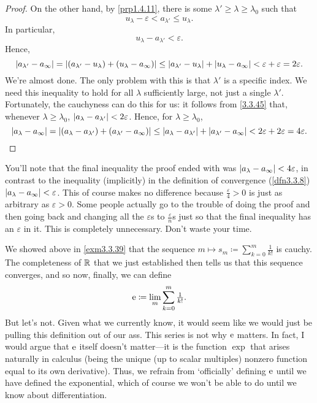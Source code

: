 \begin{thm}[Completeness of $\R$]
\begin{proof}
On the other hand, by \cref{prp1.4.11}, there is some $\lambda '\geq \lambda \geq \lambda _0$ such that
\begin{equation}
u_\lambda -\varepsilon <a_{\lambda '}\leq u_\lambda .
\end{equation}
In particular,
\begin{equation}
u_\lambda -a_{\lambda '}<\varepsilon .
\end{equation}
Hence,
\begin{equation}
\lvert a_{\lambda '}-a_\infty\rvert=\lvert(a_{\lambda '}-u_\lambda )+(u_\lambda -a_\infty )\rvert\leq \lvert a_{\lambda '}-u_\lambda\rvert+\lvert u_\lambda -a_\infty\rvert<\varepsilon +\varepsilon =2\varepsilon .
\end{equation}
We're almost done.  The only problem with this is that $\lambda '$ is a specific index.  We need this inequality to hold for all $\lambda$ sufficiently large, not just a single $\lambda '$.  Fortunately, the cauchyness can do this for us:  it follows from \eqref{3.3.45} that, whenever $\lambda \geq \lambda _0$, $\lvert a_\lambda -a_{\lambda '}\rvert<2\varepsilon$.  Hence, for $\lambda \geq \lambda _0$,
\begin{equation}
\lvert a_\lambda -a_\infty\rvert=\lvert(a_\lambda -a_{\lambda '})+(a_{\lambda '}-a_\infty)\rvert\leq \lvert a_\lambda -a_{\lambda '}\rvert+\lvert a_{\lambda '}-a_\infty\rvert<2\varepsilon +2\varepsilon =4\varepsilon .
\end{equation}
\end{proof}
\begin{rmk}
You'll note that the final inequality the proof ended with was $\lvert a_\lambda -a_\infty\rvert<4\varepsilon$, in contrast to the inequality (implicitly) in the definition of convergence (\cref{dfn3.3.8}) $\lvert a_\lambda -a_\infty\rvert<\varepsilon$.  This of course makes no difference because $\frac{\varepsilon}{4}>0$ is just as arbitrary as $\varepsilon>0$.  Some people actually go to the trouble of doing the proof and then going back and changing all the $\varepsilon$s to $\frac{\varepsilon}{n}$s just so that the final inequality has an $\varepsilon$ in it.  This is completely unnecessary.  Don't waste your time.
\end{rmk}
\end{thm}

We showed above in \cref{exm3.3.39} that the sequence $m\mapsto s_m\coloneqq \sum _{k=0}^m\frac{1}{k!}$ is cauchy.  The completeness of $\R$ that we just established then tells us that this sequence converges, and so now, finally, we can define
\begin{equation}
\mathrm{e} \coloneqq \lim _m\sum _{k=0}^m\tfrac{1}{k!}.
\end{equation}
But let's not.  Given what we currently know, it would seem like we would just be pulling this definition out of our ass.  This series is not why $\mathrm{e}$ matters.  In fact, I would argue that $\mathrm{e}$ itself doesn't matter---it is the function $\exp$ that arises naturally in calculus (being the unique (up to scalar multiples) nonzero function equal to its own derivative).  Thus, we refrain from `officially' defining $\mathrm{e}$ until we have defined the exponential, which of course we won't be able to do until we know about differentiation.

